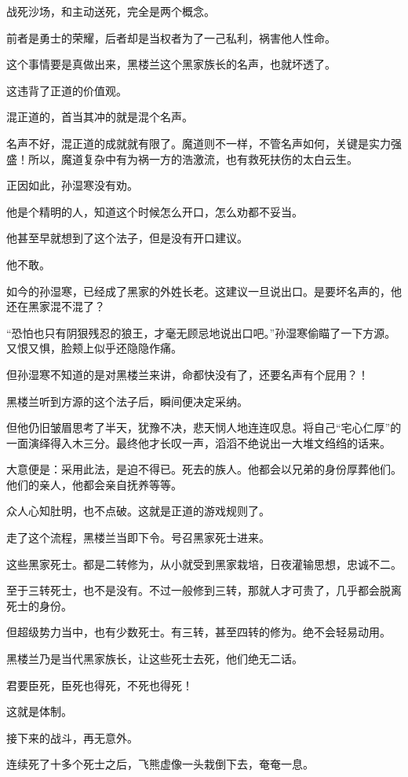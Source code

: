 \begin{this_body}
战死沙场，和主动送死，完全是两个概念。

前者是勇士的荣耀，后者却是当权者为了一己私利，祸害他人性命。

这个事情要是真做出来，黑楼兰这个黑家族长的名声，也就坏透了。

这违背了正道的价值观。

混正道的，首当其冲的就是混个名声。

名声不好，混正道的成就就有限了。魔道则不一样，不管名声如何，关键是实力强盛！所以，魔道复杂中有为祸一方的浩激流，也有救死扶伤的太白云生。

正因如此，孙湿寒没有劝。

他是个精明的人，知道这个时候怎么开口，怎么劝都不妥当。

他甚至早就想到了这个法子，但是没有开口建议。

他不敢。

如今的孙湿寒，已经成了黑家的外姓长老。这建议一旦说出口。是要坏名声的，他还在黑家混不混了？

“恐怕也只有阴狠残忍的狼王，才毫无顾忌地说出口吧。”孙湿寒偷瞄了一下方源。又恨又惧，脸颊上似乎还隐隐作痛。

但孙湿寒不知道的是对黑楼兰来讲，命都快没有了，还要名声有个屁用？！

黑楼兰听到方源的这个法子后，瞬间便决定采纳。

但他仍旧皱眉思考了半天，犹豫不决，悲天悯人地连连叹息。将自己“宅心仁厚”的一面演绎得入木三分。最终他才长叹一声，滔滔不绝说出一大堆文绉绉的话来。

大意便是：采用此法，是迫不得已。死去的族人。他都会以兄弟的身份厚葬他们。他们的亲人，他都会亲自抚养等等。

众人心知肚明，也不点破。这就是正道的游戏规则了。

走了这个流程，黑楼兰当即下令。号召黑家死士进来。

这些黑家死士。都是二转修为，从小就受到黑家栽培，日夜灌输思想，忠诚不二。

至于三转死士，也不是没有。不过一般修到三转，那就人才可贵了，几乎都会脱离死士的身份。

但超级势力当中，也有少数死士。有三转，甚至四转的修为。绝不会轻易动用。

黑楼兰乃是当代黑家族长，让这些死士去死，他们绝无二话。

君要臣死，臣死也得死，不死也得死！

这就是体制。

接下来的战斗，再无意外。

连续死了十多个死士之后，飞熊虚像一头栽倒下去，奄奄一息。


\end{this_body}

